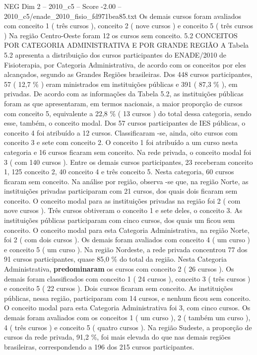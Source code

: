 \begin{textsample}{NEG Dim 2 – 2010\_c5 – Score -2.00 – 2010\_c5/enade\_2010\_fisio\_fd971bea85.txt}
Os demais cursos foram avaliados com conceito 1 ( três cursos ), conceito 2 ( nove cursos ) e conceito 5 ( três cursos ) Na região Centro-Oeste foram 12 os cursos sem conceito. 5.2 CONCEITOS POR CATEGORIA ADMINISTRATIVA E POR GRANDE REGIÃO A Tabela 5.2 apresenta a distribuição dos cursos participantes do ENADE/2010 de Fisioterapia, por Categoria Administrativa, de acordo com os conceitos por eles alcançados, segundo as Grandes Regiões brasileiras.
Dos 448 cursos participantes, 57 ( 12,7 \% ) eram ministrados em instituições públicas e 391 ( 87,3 \% ), em privadas.
De acordo com as informações da Tabela 5.2, as instituições públicas foram as que apresentaram, em termos nacionais, a maior proporção de cursos com conceito 5, equivalente a 22,8 \% ( 13 cursos ) do total dessa categoria, sendo esse, também, o conceito modal.
Dos 57 cursos participantes de IES públicas, o conceito 4 foi atribuído a 12 cursos.
Classificaram -se, ainda, oito cursos com conceito 3 e sete com conceito 2.
O conceito 1 foi atribuído a um curso nesta categoria e 16 cursos ficaram sem conceito.
Na rede privada, o conceito modal foi 3 ( com 140 cursos ).
Entre os demais cursos participantes, 23 receberam conceito 1, 125 conceito 2, 40 conceito 4 e três conceito 5.
Nesta categoria, 60 cursos ficaram sem conceito.
Na análise por região, observa -se que, na região Norte, as instituições privadas participaram com 21 cursos, dos quais dois ficaram sem conceito.
O conceito modal para as instituições privadas na região foi 2 ( com nove cursos ).
Três cursos obtiveram o conceito 1 e sete deles, o conceito 3.
As instituições públicas participaram com cinco cursos, dos quais um ficou sem conceito.
O conceito modal para esta Categoria Administrativa, na região Norte, foi 2 ( com dois cursos ).
Os demais foram avaliados com conceito 4 ( um curso ) e conceito 5 ( um curso ).
Na região Nordeste, a rede privada concentrou 77 dos 91 cursos participantes, quase 85,0 \% do total da região.
Nesta Categoria Administrativa, \textbf{predominaram} os cursos com conceito 2 ( 26 cursos ).
Os demais foram classificados com conceito 1 ( 24 cursos ), conceito 3 ( três cursos ) e conceito 5 ( 22 cursos ).
Dois cursos ficaram sem conceito.
As instituições públicas, nessa região, participaram com 14 cursos, e nenhum ficou sem conceito.
O conceito modal para esta Categoria Administrativa foi 3, com cinco cursos.
Os demais foram avaliados com os conceitos 1 ( um curso ), 2 ( também um curso ), 4 ( três cursos ) e conceito 5 ( quatro cursos ).
Na região Sudeste, a proporção de cursos da rede privada, 91,2 \%, foi mais elevada do que nas demais regiões brasileiras, correspondendo a 196 dos 215 cursos participantes.

\end{textsample}
